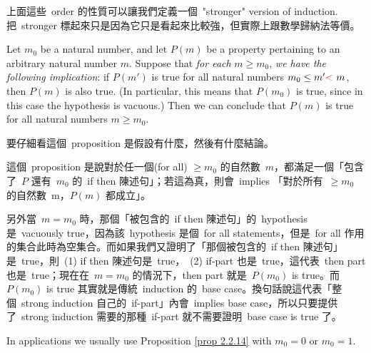 \begin{note}
上面這些\ order 的性質可以讓我們定義一個\ "stronger" version of induction. 把\ stronger 標起來只是因為它只是看起來比較強，但實際上跟數學歸納法等價。
\end{note}

\begin{proposition} \label{prop 2.2.14}
Let \(m_0\) be a natural number, and let \(P(m)\) be a property pertaining to an arbitrary natural number \(m\). Suppose that \emph{for each} \(m \geq m_0\), \emph{we have the following implication}: if \(P(m')\) is true for all natural numbers \(m_0 \leq m' \RED{<}\ m\), then \(P(m)\) is also true. (In particular, this means that \(P(m_0)\) is true, since in this case the hypothesis is vacuous.) Then we can conclude that \(P(m)\) is true for all natural numbers \(m \geq m_0\).
\end{proposition}
\begin{note}
要仔細看這個\ proposition 是假設有什麼，然後有什麼結論。

這個\ proposition 是說對於任一個(for all) \(\geq m_0\) 的自然數\ \(m\)，都滿足一個「包含了\ \(P\) 還有\ \(m_0\) 的\ if then 陳述句」；若這為真，則會\ implies 「對於所有\ \(\geq m_0\) 的自然數\ m，\(P(m)\) 都成立」。

另外當\ \(m = m_0\) 時，那個「被包含的\ if then 陳述句」的\ hypothesis 是\ vacuously true，因為該\ hypothesis 是個\ for all statements，但是\ for all 作用的集合此時為空集合。而如果我們又證明了「那個被包含的\ if then 陳述句」是\ true，則\ (1) if then 陳述句是\ true，\ (2) if-part 也是\ true，這代表\ then part 也是\ true；現在在\ \(m = m_0\) 的情況下，then part 就是\ \(P(m_0)\) is true。而\ \(P(m_0)\) is true 其實就是傳統\ induction 的\ base case。換句話說這代表「整個\ strong induction 自己的\ if-part」內會\ implies base case，所以只要提供了\ strong induction 需要的那種\ if-part 就不需要證明\ base case is true 了。
\end{note}

\begin{remark}\label{remark 2.2.15}
In applications we usually use Proposition \ref{prop 2.2.14} with \(m_0 = 0\) or \(m_0 = 1\).
\end{remark}